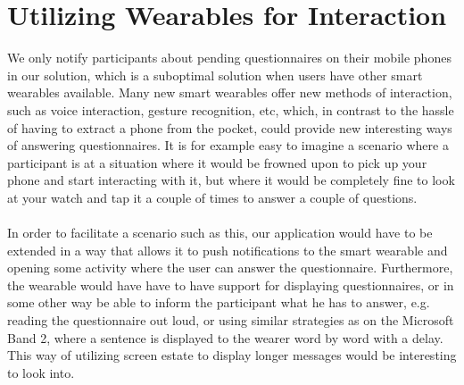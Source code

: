 
\section{Utilizing Wearables for Interaction}
\label{sec:utilizing_wearables_for_interaction}

We only notify participants about pending questionnaires on their mobile phones in our solution, which is a suboptimal solution when users have other smart wearables available. Many new smart wearables offer new methods of interaction, such as voice interaction, gesture recognition, etc, which, in contrast to the hassle of having to extract a phone from the pocket, could provide new interesting ways of answering questionnaires. It is for example easy to imagine a scenario where a participant is at a situation where it would be frowned upon to pick up your phone and start interacting with it, but where it would be completely fine to look at your watch and tap it a couple of times to answer a couple of questions. 
\\\\
In order to facilitate a scenario such as this, our application would have to be extended in a way that allows it to push notifications to the smart wearable and opening some activity where the user can answer the questionnaire. Furthermore, the wearable would have have to have support for displaying questionnaires, or in some other way be able to inform the participant what he has to answer, e.g. reading the questionnaire out loud, or using similar strategies as on the Microsoft Band 2, where a sentence is displayed to the wearer word by word with a delay. This way of utilizing screen estate to display longer messages would be interesting to look into.